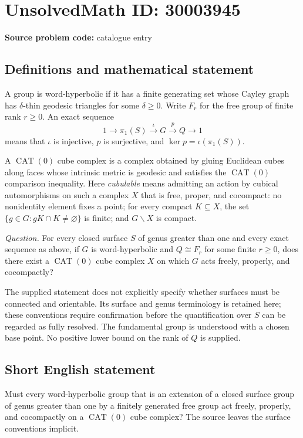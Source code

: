 \documentclass[11pt]{article}
\begin{document}
\section*{UnsolvedMath ID: 30003945}
\textbf{Source problem code:} catalogue entry
\subsection{Definitions and mathematical statement}
A group is word-hyperbolic if it has a finite generating set whose Cayley graph has \(\delta\)-thin geodesic triangles for some \(\delta\geq 0\). Write \(F_r\) for the free group of finite rank \(r\geq 0\). An exact sequence
\[
1\longrightarrow \pi_1(S)\xrightarrow{\iota}G\xrightarrow{p}Q\longrightarrow 1
\]
means that \(\iota\) is injective, \(p\) is surjective, and \(\ker p=\iota(\pi_1(S))\).

A \(\operatorname{CAT}(0)\) cube complex is a complex obtained by gluing Euclidean cubes along faces whose intrinsic metric is geodesic and satisfies the \(\operatorname{CAT}(0)\) comparison inequality. Here \emph{cubulable} means admitting an action by cubical automorphisms on such a complex \(X\) that is free, proper, and cocompact: no nonidentity element fixes a point; for every compact \(K\subseteq X\), the set \(\{g\in G:gK\cap K\neq\varnothing\}\) is finite; and \(G\backslash X\) is compact.

\emph{Question.} For every closed surface \(S\) of genus greater than one and every exact sequence as above, if \(G\) is word-hyperbolic and \(Q\cong F_r\) for some finite \(r\geq 0\), does there exist a \(\operatorname{CAT}(0)\) cube complex \(X\) on which \(G\) acts freely, properly, and cocompactly?

The supplied statement does not explicitly specify whether surfaces must be connected and orientable. Its surface and genus terminology is retained here; these conventions require confirmation before the quantification over \(S\) can be regarded as fully resolved. The fundamental group is understood with a chosen base point. No positive lower bound on the rank of \(Q\) is supplied.
\subsection{Short English statement}
Must every word-hyperbolic group that is an extension of a closed surface group of genus greater than one by a finitely generated free group act freely, properly, and cocompactly on a \(\operatorname{CAT}(0)\) cube complex? The source leaves the surface conventions implicit.
\end{document}
